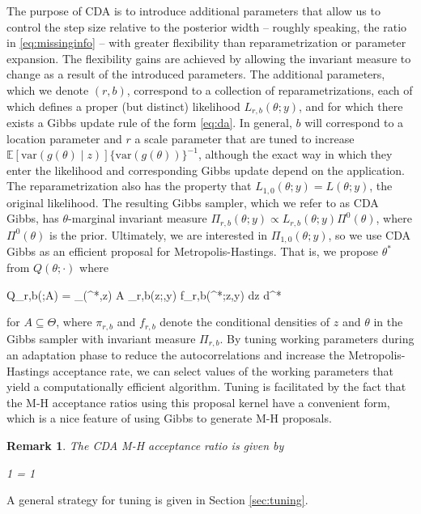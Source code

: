 \documentclass[12pt]{article}
\newtheorem{remark}{Remark}
\newcommand{\be}{\begin{equs}}
\newcommand{\ee}{\end{equs}}
\newcommand{\bb}[1]{\mathbb{#1}}
\newcommand{\mc}[1]{\mathcal{#1}}
\newcommand{\var}{\text{var}}
\begin{document}
The purpose of CDA is to introduce additional parameters that allow us to control the step size relative to the posterior width -- roughly speaking, the ratio in \eqref{eq:missinginfo} -- with greater flexibility than reparametrization or parameter expansion. The flexibility gains are achieved by allowing the invariant measure to change as a result of the introduced parameters. The additional parameters, which we denote $(r,b)$, correspond to a collection of reparametrizations, each of which defines a proper (but distinct) likelihood $L_{r,b}(\theta;y)$, and for which there exists a Gibbs update rule of the form \eqref{eq:da}. In general, $b$ will correspond to a location parameter and $r$ a scale parameter that are tuned to increase $\bb E[\var(g(\theta) \mid z)]\{\var(g(\theta))\}^{-1}$, although the exact way in which they enter the likelihood and corresponding Gibbs update depend on the application. The reparametrization also has the property that $L_{1,0}(\theta;y) = L(\theta;y)$, the original likelihood. The resulting Gibbs sampler, which we refer to as CDA Gibbs, has $\theta$-marginal invariant measure $\Pi_{r,b}(\theta;y) \propto L_{r,b}(\theta;y) \Pi^0(\theta)$, where $\Pi^0(\theta)$ is the prior. Ultimately, we are interested in $\Pi_{1,0}(\theta;y)$, so we use CDA Gibbs as an efficient proposal for Metropolis-Hastings. That is, we propose $\theta^*$ from $Q(\theta;\cdot)$ where
\be \label{eq:Q}
Q_{r,b}(\theta;A) = \int_{(\theta^*,z) \in A \times \mc Z} \pi_{r,b}(z;\theta,y) f_{r,b}(\theta^*;z,y) dz d\theta^*
\ee
for $A \subseteq \Theta$, where $\pi_{r,b}$ and $f_{r,b}$ denote the conditional densities of $z$ and $\theta$ in the Gibbs sampler with invariant measure $\Pi_{r,b}$. By tuning working parameters during an adaptation phase to reduce the autocorrelations and increase the Metropolis-Hastings acceptance rate, we can select values of the working parameters that yield a computationally efficient algorithm. Tuning is facilitated by the fact that the M-H acceptance ratios using this proposal kernel have a convenient form, which is a nice feature of using Gibbs to generate M-H proposals.
\begin{remark} \label{rem:accrat}
The CDA M-H acceptance ratio is given by
\be
1 \wedge {} = 1 \wedge {} \label{eq:mh-accrat}
\ee
\end{remark}
A general strategy for tuning is given in Section \ref{sec:tuning}. 
\end{document}
